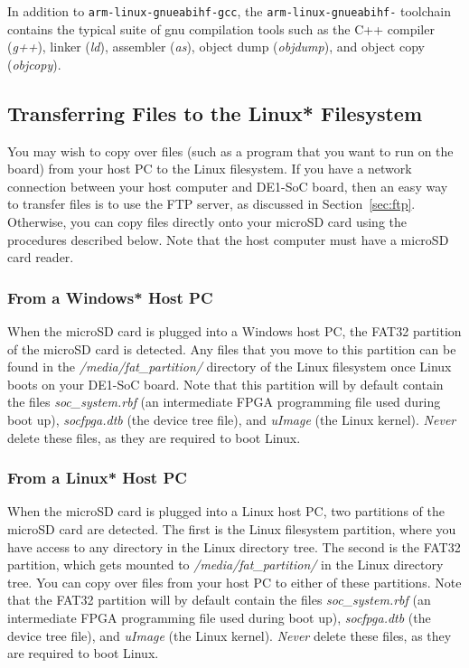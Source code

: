 \documentclass[11pt, twoside, pdftex]{article}
\begin{document}
In addition to \texttt{arm-linux-gnueabihf-gcc}, the \texttt{arm-linux-gnueabihf-} toolchain 
contains the typical suite of gnu compilation tools such as the C++ compiler (\textit{g++}), 
linker (\textit{ld}), assembler (\textit{as}), object dump (\textit{objdump}), and object 
copy (\textit{objcopy}).

\subsection*{Transferring Files to the Linux* Filesystem}
\label{sec:transfer_files}

You may wish to copy over files (such as a program that you want to run on the board) from 
your host PC to the Linux filesystem. If you have a network connection between your host
computer and DE1-SoC board, then an easy way to transfer files is to use the FTP server,
as discussed in Section~\ref{sec:ftp}. Otherwise, you can copy files directly onto your
microSD card using the procedures described below. Note that the host computer must have a 
microSD card reader.

\subsubsection*{From a Windows* Host PC}

When the microSD card is plugged into a Windows host PC, the FAT32 partition of the
microSD card is detected. Any files that you move to this partition can be found in the
\textit{/media/fat\_partition/} directory of the Linux filesystem once Linux boots on your
DE1-SoC board. Note that this partition will by default contain the files
\textit{soc\_system.rbf} (an intermediate FPGA programming file used during boot up),
\textit{socfpga.dtb} (the device tree file), and \textit{uImage} (the Linux kernel). {\it Never}
delete these files, as they are required to boot Linux.

\subsubsection*{From a Linux* Host PC}

When the microSD card is plugged into a Linux host PC, two partitions of the microSD card
are detected. The first is the Linux filesystem partition, where you have access to any
directory in the Linux directory tree. The second is the FAT32 partition, which gets
mounted to \textit{/media/fat\_partition/} in the Linux directory tree. You can copy over
files from your host PC to either of these partitions. Note that the FAT32 partition will
by default contain the files \textit{soc\_system.rbf} (an intermediate FPGA programming
file used during boot up), \textit{socfpga.dtb} (the device tree file), and
\textit{uImage} (the Linux kernel). {\it Never} delete these files, as they are required to boot Linux. 
\end{document}
